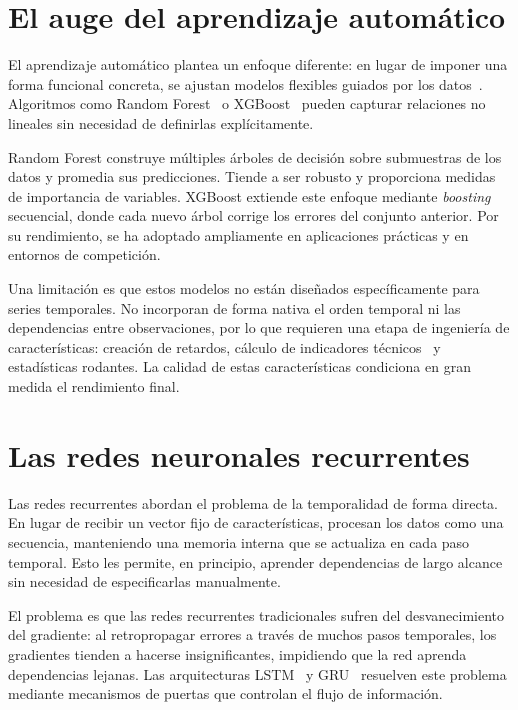 \section{El auge del aprendizaje automático}

El aprendizaje automático plantea un enfoque diferente: en lugar de imponer una forma funcional concreta, se ajustan modelos flexibles guiados por los datos~\cite{lecun2015deep}. Algoritmos como Random Forest~\cite{breiman2001random} o XGBoost~\cite{chen2016xgboost} pueden capturar relaciones no lineales sin necesidad de definirlas explícitamente.

Random Forest construye múltiples árboles de decisión sobre submuestras de los datos y promedia sus predicciones. Tiende a ser robusto y proporciona medidas de importancia de variables. XGBoost extiende este enfoque mediante \textit{boosting} secuencial, donde cada nuevo árbol corrige los errores del conjunto anterior. Por su rendimiento, se ha adoptado ampliamente en aplicaciones prácticas y en entornos de competición.

Una limitación es que estos modelos no están diseñados específicamente para series temporales. No incorporan de forma nativa el orden temporal ni las dependencias entre observaciones, por lo que requieren una etapa de ingeniería de características: creación de retardos, cálculo de indicadores técnicos~\cite{murphy1999technical} y estadísticas rodantes. La calidad de estas características condiciona en gran medida el rendimiento final.

\section{Las redes neuronales recurrentes}

Las redes recurrentes abordan el problema de la temporalidad de forma directa. En lugar de recibir un vector fijo de características, procesan los datos como una secuencia, manteniendo una memoria interna que se actualiza en cada paso temporal. Esto les permite, en principio, aprender dependencias de largo alcance sin necesidad de especificarlas manualmente.

El problema es que las redes recurrentes tradicionales sufren del desvanecimiento del gradiente: al retropropagar errores a través de muchos pasos temporales, los gradientes tienden a hacerse insignificantes, impidiendo que la red aprenda dependencias lejanas. Las arquitecturas LSTM~\cite{hochreiter1997long} y GRU~\cite{cho2014learning} resuelven este problema mediante mecanismos de puertas que controlan el flujo de información.

